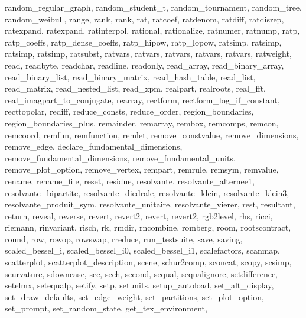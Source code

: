 {{    random_regular_graph,
    random_student_t,
    random_tournament,
    random_tree,
    random_weibull,
    range,
    rank,
    rank,
    rat,
    ratcoef,
    ratdenom,
    ratdiff,
    ratdisrep,
    ratexpand,
    ratexpand,
    ratinterpol,
    rational,
    rationalize,
    ratnumer,
    ratnump,
    ratp,
    ratp_coeffs,
    ratp_dense_coeffs,
    ratp_hipow,
    ratp_lopow,
    ratsimp,
    ratsimp,
    ratsimp,
    ratsimp,
    ratsubst,
    ratvars,
    ratvars,
    ratvars,
    ratvars,
    ratvars,
    ratweight,
    read,
    readbyte,
    readchar,
    readline,
    readonly,
    read_array,
    read_binary_array,
    read_binary_list,
    read_binary_matrix,
    read_hash_table,
    read_list,
    read_matrix,
    read_nested_list,
    read_xpm,
    realpart,
    realroots,
    real_fft,
    real_imagpart_to_conjugate,
    rearray,
    rectform,
    rectform_log_if_constant,
    recttopolar,
    rediff,
    reduce_consts,
    reduce_order,
    region_boundaries,
    region_boundaries_plus,
    remainder,
    remarray,
    rembox,
    remcomps,
    remcon,
    remcoord,
    remfun,
    remfunction,
    remlet,
    remove_constvalue,
    remove_dimensions,
    remove_edge,
    declare_fundamental_dimensions,
    remove_fundamental_dimensions,
    remove_fundamental_units,
    remove_plot_option,
    remove_vertex,
    rempart,
    remrule,
    remsym,
    remvalue,
    rename,
    rename_file,
    reset,
    residue,
    resolvante,
    resolvante_alternee1,
    resolvante_bipartite,
    resolvante_diedrale,
    resolvante_klein,
    resolvante_klein3,
    resolvante_produit_sym,
    resolvante_unitaire,
    resolvante_vierer,
    rest,
    resultant,
    return,
    reveal,
    reverse,
    revert,
    revert2,
    revert,
    revert2,
    rgb2level,
    rhs,
    ricci,
    riemann,
    rinvariant,
    risch,
    rk,
    rmdir,
    rncombine,
    romberg,
    room,
    rootscontract,
    round,
    row,
    rowop,
    rowswap,
    rreduce,
    run_testsuite,
    save,
    saving,
    scaled_bessel_i,
    scaled_bessel_i0,
    scaled_bessel_i1,
    scalefactors,
    scanmap,
    scatterplot,
    scatterplot_description,
    scene,
    schur2comp,
    sconcat,
    scopy,
    scsimp,
    scurvature,
    sdowncase,
    sec,
    sech,
    second,
    sequal,
    sequalignore,
    setdifference,
    setelmx,
    setequalp,
    setify,
    setp,
    setunits,
    setup_autoload,
    set_alt_display,
    set_draw_defaults,
    set_edge_weight,
    set_partitions,
    set_plot_option,
    set_prompt,
    set_random_state,
    get_tex_environment,
}}
